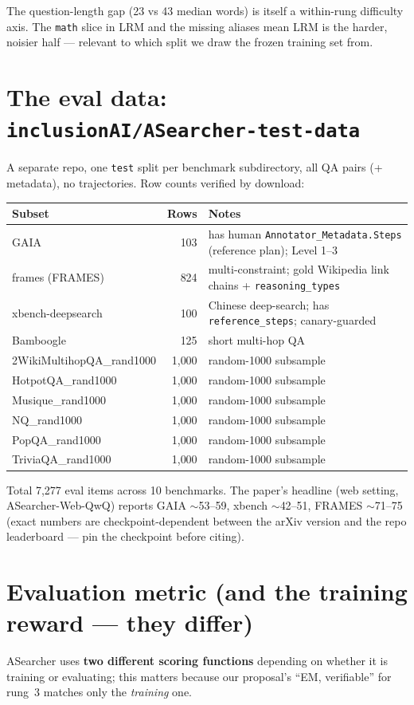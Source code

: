 \documentclass[10pt]{article}
\newcommand{\cmd}[1]{\texttt{\small #1}}
\begin{document}
\noindent The question-length gap (23 vs 43 median words) is itself a within-rung difficulty axis. The
\cmd{math} slice in LRM and the missing aliases mean LRM is the harder, noisier half --- relevant to which
split we draw the frozen training set from.

\section{The eval data: \cmd{inclusionAI/ASearcher-test-data}}
A separate repo, one \cmd{test} split per benchmark subdirectory, all QA pairs (+ metadata), no
trajectories. Row counts verified by download:

\begin{center}\small
\begin{tabular}{lrl}
\toprule
Subset & Rows & Notes \\
\midrule
GAIA & 103 & has human \cmd{Annotator\_Metadata.Steps} (reference plan); Level 1--3 \\
frames (FRAMES) & 824 & multi-constraint; gold Wikipedia link chains + \cmd{reasoning\_types} \\
xbench-deepsearch & 100 & Chinese deep-search; has \cmd{reference\_steps}; canary-guarded \\
Bamboogle & 125 & short multi-hop QA \\
2WikiMultihopQA\_rand1000 & 1{,}000 & random-1000 subsample \\
HotpotQA\_rand1000 & 1{,}000 & random-1000 subsample \\
Musique\_rand1000 & 1{,}000 & random-1000 subsample \\
NQ\_rand1000 & 1{,}000 & random-1000 subsample \\
PopQA\_rand1000 & 1{,}000 & random-1000 subsample \\
TriviaQA\_rand1000 & 1{,}000 & random-1000 subsample \\
\bottomrule
\end{tabular}
\end{center}
\noindent Total 7{,}277 eval items across 10 benchmarks. The paper's headline (web setting, ASearcher-Web-QwQ)
reports GAIA $\sim$53--59, xbench $\sim$42--51, FRAMES $\sim$71--75 (exact numbers are checkpoint-dependent
between the arXiv version and the repo leaderboard --- pin the checkpoint before citing).

\section{Evaluation metric (and the training reward --- they differ)}
ASearcher uses \textbf{two different scoring functions} depending on whether it is training or evaluating;
this matters because our proposal's ``EM, verifiable'' for rung~3 matches only the \emph{training} one.
\end{document}
